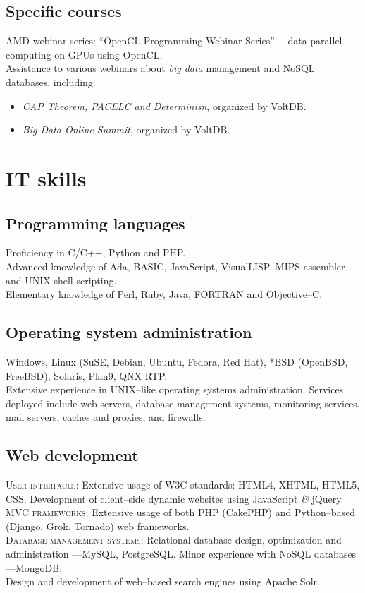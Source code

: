 \documentclass[11pt, a4paper]{article}
\newcommand{\amper}
           {{\fontspec[Scale=.95]
                      {Adobe Caslon Pro}\selectfont\itshape\&}}
\newcommand{\years}[1]{\marginnote{\scriptsize #1}}
\begin{document}
\subsection*{Specific courses}
\noindent
\years{2010}AMD webinar series: ``OpenCL Programming Webinar Series'' ---data parallel computing on GPUs using OpenCL.\\
\years{2011}Assistance to various webinars about \textit{big data} management and NoSQL databases, including:
\begin{itemize}
	\item  \emph{CAP Theorem, PACELC and Determinisn}, organized by VoltDB.
	\item  \emph{Big Data Online Summit}, organized by VoltDB.
\end{itemize}


\section*{IT skills} %
\subsection*{Programming languages}
\noindent
	Proficiency in C/C++, Python and PHP.\\
	Advanced knowledge of Ada, BASIC, JavaScript, VisualLISP, MIPS assembler and UNIX shell scripting.\\
	Elementary knowledge of Perl, Ruby, Java, FORTRAN and Objective--C.
\subsection*{Operating system administration}
\noindent
	Windows, Linux (SuSE, Debian, Ubuntu, Fedora, Red Hat), *BSD (OpenBSD, FreeBSD), Solaris, Plan9, QNX RTP.\\
	Extensive experience in UNIX--like operating systems administration. Services deployed include web servers, database management systems, monitoring services, mail servers, caches and proxies, and firewalls.
\subsection*{Web development}
\noindent
	\textsc{User interfaces}: Extensive usage of W3C standards: HTML4, XHTML, HTML5, CSS. Development of client--side dynamic websites using JavaScript \amper{} jQuery.\\
	\textsc{MVC frameworks}: Extensive usage of both PHP (CakePHP) and Python--based (Django, Grok, Tornado) web frameworks.\\
	\textsc{Database management systems}: Relational database design, optimization and administration ---MySQL, PostgreSQL. Minor experience with NoSQL databases ---MongoDB.\\
	Design and development of web--based search engines using Apache Solr.
\end{document}
